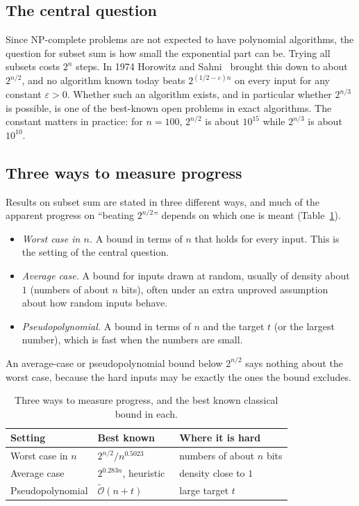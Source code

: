 \documentclass[11pt]{article}
\newcommand{\Ot}{\tilde{\mathcal{O}}}
\begin{document}
\subsection{The central question}
Since NP-complete problems are not expected to have polynomial algorithms, the
question for subset sum is how small the exponential part can be. Trying all
subsets costs $2^n$ steps. In 1974 Horowitz and Sahni~\cite{hs} brought this
down to about $2^{n/2}$, and no algorithm known today beats
$2^{(1/2-\varepsilon)n}$ on every input for any constant $\varepsilon>0$.
Whether such an algorithm exists, and in particular whether $2^{n/3}$ is
possible, is one of the best-known open problems in exact algorithms. The
constant matters in practice: for $n=100$, $2^{n/2}$ is about $10^{15}$ while
$2^{n/3}$ is about $10^{10}$.

\subsection{Three ways to measure progress}
Results on subset sum are stated in three different ways, and much of the
apparent progress on ``beating $2^{n/2}$'' depends on which one is meant
(Table~\ref{tab:regimes}).
\begin{itemize}
\item \emph{Worst case in $n$.} A bound in terms of $n$ that holds for every
input. This is the setting of the central question.
\item \emph{Average case.} A bound for inputs drawn at random, usually of
density about $1$ (numbers of about $n$ bits), often under an extra
unproved assumption about how random inputs behave.
\item \emph{Pseudopolynomial.} A bound in terms of $n$ and the target $t$ (or
the largest number), which is fast when the numbers are small.
\end{itemize}
An average-case or pseudopolynomial bound below $2^{n/2}$ says nothing about the
worst case, because the hard inputs may be exactly the ones the bound
excludes.

\begin{table}[t]
\centering
\caption{Three ways to measure progress, and the best known classical bound in
each.}
\label{tab:regimes}
\small
\begin{tabular}{p{3.2cm}p{4.2cm}p{4.6cm}}
\toprule
Setting & Best known & Where it is hard \\
\midrule
Worst case in $n$ & $2^{n/2}/n^{0.5023}$~\cite{chen} & numbers of about $n$ bits \\
Average case & $2^{0.283n}$, heuristic~\cite{bbss} & density close to $1$ \\
Pseudopolynomial & $\Ot(n+t)$~\cite{bri} & large target $t$ \\
\bottomrule
\end{tabular}
\end{table}
\end{document}

